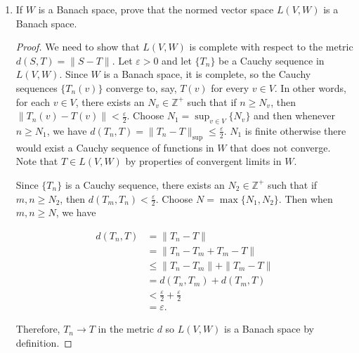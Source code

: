 \documentclass[11pt,oneside,english]{amsart}
\theoremstyle{definition}
\newcommand{\aspace}{\hspace{7mm}\text{and}\hspace{7mm}}
\newcommand{\ve}{\varepsilon}
\newcommand{\MB}[1]{\mathbb{#1}}
\begin{document}
\begin{enumerate}
\begin{enumerate}
\begin{proof}
\[
\|S+T\|\leq\|S\|+\|T\|\leq M_1\|v\|+M_2\|v\|=(M_1+M_2)\|v\|,\aspace \|\lambda T\|=|\lambda|\,\|T\|\leq\lambda M_2\|v\|,
\]

so $S+T$ and $\lambda T$ are bounded which means they are in $L(V,W)$. The additive identity is the 0 map and the multiplicative identity is the unit map 1. Since $W$ is a vector space, the other properties of a vector space hold, and thus $L(V,W)$ is a normed vector space.
\end{proof}


\item If $W$ is a Banach space, prove that the normed vector space $L(V,W)$ is a Banach space.

\begin{proof}
We need to show that $L(V,W)$ is complete with respect to the metric $d(S,T)=\|S-T\|$. Let $\ve>0$ and let $\{T_n\}$ be a Cauchy sequence in $L(V,W)$. Since $W$ is a Banach space, it is complete, so the Cauchy sequences $\{T_n(v)\}$  converge to, say, $T(v)$ for every $v\in V$. In other words, for each $v\in V$, there exists an $N_v\in\MB{Z}^+$ such that if $n\geq N_v$, then $\|T_n(v)-T(v)\|<\frac{\ve}{2}$. Choose $N_1=\sup_{v\in V}\{N_v\}$ and then whenever $n\geq N_1$, we have $d(T_n,T)=\|T_n-T\|_{\sup}\leq\frac{\ve}{2}$. $N_1$ is finite otherwise there would exist a Cauchy sequence of functions in $W$ that does not converge. Note that $T\in L(V,W)$ by properties of convergent limits in $W$.

Since $\{T_n\}$ is a Cauchy sequence, there exists an $N_2\in\MB{Z}^+$ such that if $m,n\geq N_2$, then $d(T_m,T_n)<\frac{\ve}{2}$. Choose $N=\max\{N_1,N_2\}$. Then when $m,n\geq N$, we have 

\vspace*{-5mm}
\begin{align*}
d(T_n,T)&=\|T_n-T\|\\[2mm]
&=\|T_n-T_m+T_m-T\|\\[2mm]
&\leq\|T_n-T_m\|+\|T_m-T\|\\[2mm]
&=d(T_n,T_m)+d(T_m,T)\\[2mm]
&<\frac{\ve}{2}+\frac{\ve}{2}\\[2mm]
&=\ve.
\end{align*}

Therefore, $T_n\rightarrow T$ in the metric $d$ so $L(V,W)$ is a Banach space by definition.
\end{proof}
\end{enumerate}

\pagebreak


\end{enumerate}
\end{document}
